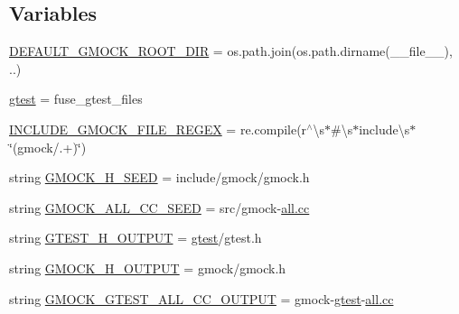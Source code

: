 \subsection*{Variables}
\begin{DoxyCompactItemize}
\item 
\hyperlink{namespacefuse__gmock__files_a900b64b34e20c7430b72252192a3c7ed}{D\+E\+F\+A\+U\+L\+T\+\_\+\+G\+M\+O\+C\+K\+\_\+\+R\+O\+O\+T\+\_\+\+D\+IR} = os.\+path.\+join(os.\+path.\+dirname(\+\_\+\+\_\+file\+\_\+\+\_\+), \textquotesingle{}..\textquotesingle{})
\item 
\hyperlink{namespacefuse__gmock__files_a3fb36dbe8d361f9ecc54e1aa4b94b068}{gtest} = fuse\+\_\+gtest\+\_\+files
\item 
\hyperlink{namespacefuse__gmock__files_aeb4457451f878d6bc8a42f7ff3e5f6cf}{I\+N\+C\+L\+U\+D\+E\+\_\+\+G\+M\+O\+C\+K\+\_\+\+F\+I\+L\+E\+\_\+\+R\+E\+G\+EX} = re.\+compile(r\textquotesingle{}$^\wedge$\textbackslash{}s$\ast$\#\textbackslash{}s$\ast$include\textbackslash{}s$\ast$\char`\"{}(gmock/.+)\char`\"{}\textquotesingle{})
\item 
string \hyperlink{namespacefuse__gmock__files_aa31b816a9048fb3fa9d482eeac69c139}{G\+M\+O\+C\+K\+\_\+\+H\+\_\+\+S\+E\+ED} = \textquotesingle{}include/gmock/gmock.\+h\textquotesingle{}
\item 
string \hyperlink{namespacefuse__gmock__files_a518e1f3cc3f184747e6ed3f2d0233c99}{G\+M\+O\+C\+K\+\_\+\+A\+L\+L\+\_\+\+C\+C\+\_\+\+S\+E\+ED} = \textquotesingle{}src/gmock-\/\hyperlink{gtest__output__test__golden__lin_8txt_a36ebfe06d2a8523cebd158fbc62be565}{all.\+cc}\textquotesingle{}
\item 
string \hyperlink{namespacefuse__gmock__files_a385c31d8542b0a2e4b7f46cb2a32d7da}{G\+T\+E\+S\+T\+\_\+\+H\+\_\+\+O\+U\+T\+P\+UT} = \textquotesingle{}\hyperlink{namespacefuse__gmock__files_a3fb36dbe8d361f9ecc54e1aa4b94b068}{gtest}/gtest.\+h\textquotesingle{}
\item 
string \hyperlink{namespacefuse__gmock__files_aba0664abeb60f34cfdf59e8475a465d0}{G\+M\+O\+C\+K\+\_\+\+H\+\_\+\+O\+U\+T\+P\+UT} = \textquotesingle{}gmock/gmock.\+h\textquotesingle{}
\item 
string \hyperlink{namespacefuse__gmock__files_a9759f3f6c404e3292c26c9317792e846}{G\+M\+O\+C\+K\+\_\+\+G\+T\+E\+S\+T\+\_\+\+A\+L\+L\+\_\+\+C\+C\+\_\+\+O\+U\+T\+P\+UT} = \textquotesingle{}gmock-\/\hyperlink{namespacefuse__gmock__files_a3fb36dbe8d361f9ecc54e1aa4b94b068}{gtest}-\/\hyperlink{gtest__output__test__golden__lin_8txt_a36ebfe06d2a8523cebd158fbc62be565}{all.\+cc}\textquotesingle{}
\end{DoxyCompactItemize}


